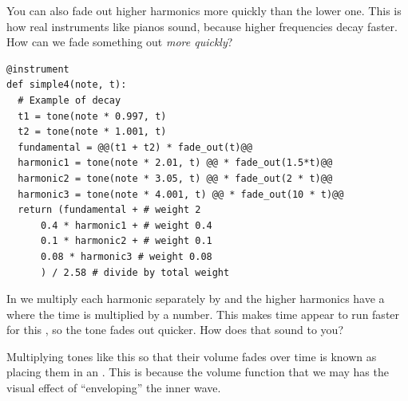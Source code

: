 You can also fade out higher harmonics more quickly than the lower one. This is how real instruments
like pianos sound, because higher frequencies decay faster. How can we fade something out \emph{more
quickly}?

\begin{TryThisBox}
\begin{lstlisting}
@instrument
def simple4(note, t):
  # Example of decay
  t1 = tone(note * 0.997, t)
  t2 = tone(note * 1.001, t)
  fundamental = @@(t1 + t2) * fade_out(t)@@
  harmonic1 = tone(note * 2.01, t) @@ * fade_out(1.5*t)@@
  harmonic2 = tone(note * 3.05, t) @@ * fade_out(2 * t)@@
  harmonic3 = tone(note * 4.001, t) @@ * fade_out(10 * t)@@
  return (fundamental + # weight 2
      0.4 * harmonic1 + # weight 0.4
      0.1 * harmonic2 + # weight 0.1
      0.08 * harmonic3 # weight 0.08
      ) / 2.58 # divide by total weight
\end{lstlisting}
\end{TryThisBox}


In  we multiply each harmonic separately by  and the higher harmonics
have a  where the time  is multiplied by a number. This makes time appear to
run faster for this , so the tone fades out quicker. How does that sound to you?

Multiplying tones like this so that their volume fades over time is known as placing them in
an . This is because the volume function that we may has the visual effect of
``enveloping'' the inner wave.

